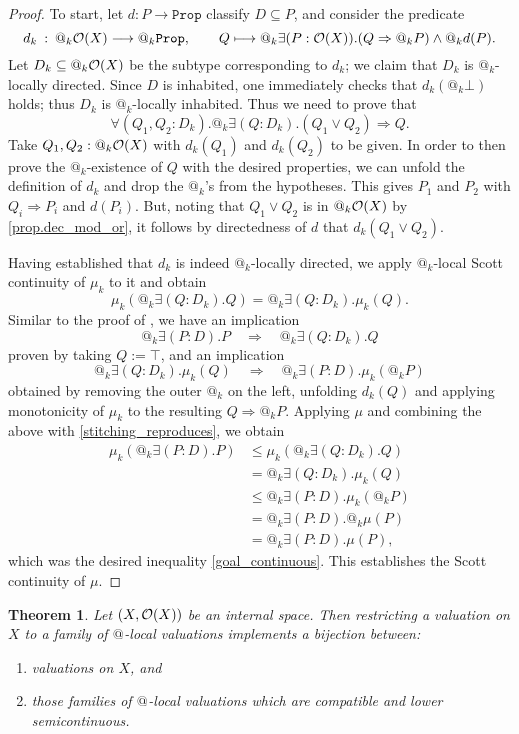 \documentclass[11pt, oneside, article]{memoir}
\makeatletter
\theoremstyle{plain}
\newtheorem{theorem}{Theorem}[chapter] %
\theoremstyle{definition}
\theoremstyle{remark}
\renewcommand{\ss}{\subseteq}
\newcommand{\const}[1]{\mathtt{#1}}
\newcommand{\prop}{\const{Prop}}
\newcommand{\Op}[1][undef]{\ifthenelse{\equal{#1}{undef}}{\mathcal{O}}{\mathcal{O}(#1)}}
\newcommand{\pt}{k}				%
\newcommand{\AtSymbol}{{@}}
\newcommand{\At}[1][\pt]{\AtSymbol_{#1}}
\newcommand{\imp}{\Rightarrow}
\makeatother
\begin{document}
\begin{proof}
To start, let $d\colon P\to\prop$ classify $D\ss P$, and consider the predicate
	\[
		d_\pt \: : \: \At \Op[X] \longrightarrow \At \prop, \qquad Q \longmapsto \At \exists (P : \Op[X]) . (Q \imp \At P) \land \At d(P).
	\]
	Let $D_\pt\ss\At\Op[X]$ be the subtype corresponding to $d_\pt$; we claim that $D_\pt$ is $\At$-locally directed. Since $D$ is inhabited, one immediately checks that $d_\pt(\At\bot)$ holds; thus $D_\pt$ is $\At$-locally inhabited. Thus we need to prove that
\[
		\forall(Q_1, Q_2 : D_\pt ) .\At \exists (Q : D_\pt) .(Q_1 \vee Q_2)  \imp Q.
\]
	Take $Q_1, Q_2 : \At \Op[X]$ with $d_\pt(Q_1)$ and $d_\pt(Q_2)$ to be given. In order to then prove the $\At$-existence of $Q$ with the desired properties, we can unfold the definition of $d_\pt$ and drop the $\At$'s from the hypotheses. This gives $P_1$ and $P_2$ with $Q_i \imp P_i$ and $d(P_i)$. But, noting that $Q_1\lor Q_2$ is in $\At\Op[X]$ by \cref{prop.dec_mod_or}, it follows by directedness of $d$ that $d_\pt(Q_1 \lor Q_2)$.

	Having established that $d_k$ is indeed $\At$-locally directed, we apply $\At$-local Scott continuity of $\mu_\pt$ to it and obtain
\[
		\mu_\pt\left( \At \exists (Q : D_\pt). Q \right) = 
		\At \exists (Q : D_\pt) . \mu_\pt(Q).
\]
	Similar to the proof of , we have an implication
	\[
		\At \exists (P : D). P \quad \Longrightarrow \quad \At \exists (Q : D_\pt) . Q
	\]
	proven by taking $Q := \top$, and an implication
	\[
		\At \exists (Q : D_\pt) . \mu_\pt(Q) \quad \Longrightarrow \quad \At \exists (P : D) . \mu_\pt(\At P)
	\]
	obtained by removing the outer $\At$ on the left, unfolding $d_\pt(Q)$ and applying monotonicity of $\mu_\pt$ to the resulting $Q \imp \At P$. Applying $\mu$ and combining the above with \eqref{stitching_reproduces}, we obtain
	\begin{align*}
			\mu_\pt(\At \exists (P : D) . P) &\le
			\mu_\pt(\At \exists (Q : D_k). Q)\\&=
			\At \exists (Q : D_\pt).\mu_\pt(Q)\\&\leq
			\At \exists (P : D). \mu_\pt(\At P)\\&=
			\At \exists (P : D). \At\mu(P)\\&=
			\At \exists (P : D). \mu(P),
  \end{align*}
which was the desired inequality \eqref{goal_continuous}. This establishes the Scott continuity of $\mu$.
\end{proof}

\begin{theorem}
	\label{main_internal}
	Let $(X,\Op[X])$ be an internal space. Then restricting a valuation on $X$ to a family of $\At[]$-local valuations implements a bijection between:
	\begin{enumerate}
		\item valuations on $X$, and
		\item those families of $\At[]$-local valuations which are compatible and lower semicontinuous.
	\end{enumerate}
\end{theorem}
\end{document}

